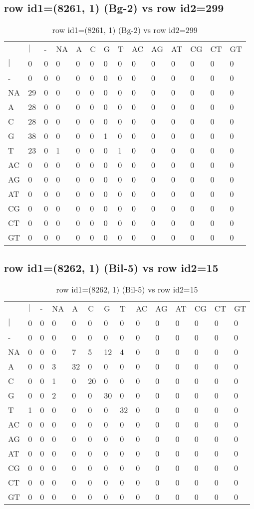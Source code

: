 \subsection{row id1=(8261, 1) (Bg-2) vs row id2=299}
\begin{center}
\begin{longtable}{|l|l|l|l|l|l|l|l|l|l|l|l|l|l|}
\caption{row id1=(8261, 1) (Bg-2) vs row id2=299} \label{table_dm408}\\
\hline
\\
\hline
&$|$&-&NA&A&C&G&T&AC&AG&AT&CG&CT&GT\\
$|$&0&0&0&0&0&0&0&0&0&0&0&0&0\\
-&0&0&0&0&0&0&0&0&0&0&0&0&0\\
NA&29&0&0&0&0&0&0&0&0&0&0&0&0\\
A&28&0&0&0&0&0&0&0&0&0&0&0&0\\
C&28&0&0&0&0&0&0&0&0&0&0&0&0\\
G&38&0&0&0&0&1&0&0&0&0&0&0&0\\
T&23&0&1&0&0&0&1&0&0&0&0&0&0\\
AC&0&0&0&0&0&0&0&0&0&0&0&0&0\\
AG&0&0&0&0&0&0&0&0&0&0&0&0&0\\
AT&0&0&0&0&0&0&0&0&0&0&0&0&0\\
CG&0&0&0&0&0&0&0&0&0&0&0&0&0\\
CT&0&0&0&0&0&0&0&0&0&0&0&0&0\\
GT&0&0&0&0&0&0&0&0&0&0&0&0&0\\
\hline
\end{longtable}
\end{center}

\subsection{row id1=(8262, 1) (Bil-5) vs row id2=15}
\begin{center}
\begin{longtable}{|l|l|l|l|l|l|l|l|l|l|l|l|l|l|}
\caption{row id1=(8262, 1) (Bil-5) vs row id2=15} \label{table_dm410}\\
\hline
\\
\hline
&$|$&-&NA&A&C&G&T&AC&AG&AT&CG&CT&GT\\
$|$&0&0&0&0&0&0&0&0&0&0&0&0&0\\
-&0&0&0&0&0&0&0&0&0&0&0&0&0\\
NA&0&0&0&7&5&12&4&0&0&0&0&0&0\\
A&0&0&3&32&0&0&0&0&0&0&0&0&0\\
C&0&0&1&0&20&0&0&0&0&0&0&0&0\\
G&0&0&2&0&0&30&0&0&0&0&0&0&0\\
T&1&0&0&0&0&0&32&0&0&0&0&0&0\\
AC&0&0&0&0&0&0&0&0&0&0&0&0&0\\
AG&0&0&0&0&0&0&0&0&0&0&0&0&0\\
AT&0&0&0&0&0&0&0&0&0&0&0&0&0\\
CG&0&0&0&0&0&0&0&0&0&0&0&0&0\\
CT&0&0&0&0&0&0&0&0&0&0&0&0&0\\
GT&0&0&0&0&0&0&0&0&0&0&0&0&0\\
\hline
\end{longtable}
\end{center}

